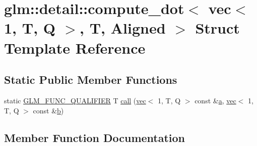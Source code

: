 \hypertarget{structglm_1_1detail_1_1compute__dot_3_01vec_3_011_00_01_t_00_01_q_01_4_00_01_t_00_01_aligned_01_4}{}\section{glm\+:\+:detail\+:\+:compute\+\_\+dot$<$ vec$<$ 1, T, Q $>$, T, Aligned $>$ Struct Template Reference}
\label{structglm_1_1detail_1_1compute__dot_3_01vec_3_011_00_01_t_00_01_q_01_4_00_01_t_00_01_aligned_01_4}
\subsection*{Static Public Member Functions}
\begin{DoxyCompactItemize}
\item 
static \mbox{\hyperlink{setup_8hpp_a33fdea6f91c5f834105f7415e2a64407}{G\+L\+M\+\_\+\+F\+U\+N\+C\+\_\+\+Q\+U\+A\+L\+I\+F\+I\+ER}} T \mbox{\hyperlink{structglm_1_1detail_1_1compute__dot_3_01vec_3_011_00_01_t_00_01_q_01_4_00_01_t_00_01_aligned_01_4_ae4911d1dd9eddcd2813e2935b0f327fc}{call}} (\mbox{\hyperlink{structglm_1_1vec}{vec}}$<$ 1, T, Q $>$ const \&\mbox{\hyperlink{_s_d_l__opengl__glext_8h_a3309789fc188587d666cda5ece79cf82}{a}}, \mbox{\hyperlink{structglm_1_1vec}{vec}}$<$ 1, T, Q $>$ const \&\mbox{\hyperlink{_s_d_l__opengl__glext_8h_a0f71581a41fd2264c8944126dabbd010}{b}})
\end{DoxyCompactItemize}


\subsection{Member Function Documentation}
\mbox{\label{structglm_1_1detail_1_1compute__dot_3_01vec_3_011_00_01_t_00_01_q_01_4_00_01_t_00_01_aligned_01_4_ae4911d1dd9eddcd2813e2935b0f327fc}} 

